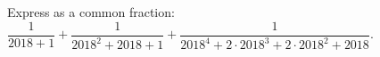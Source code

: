 Express as a common fraction: $\dfrac1{2018+1}+\dfrac1{2018^2+2018+1}+\dfrac1{2018^4+2\cdot2018^3+2\cdot2018^2+2018}$.

